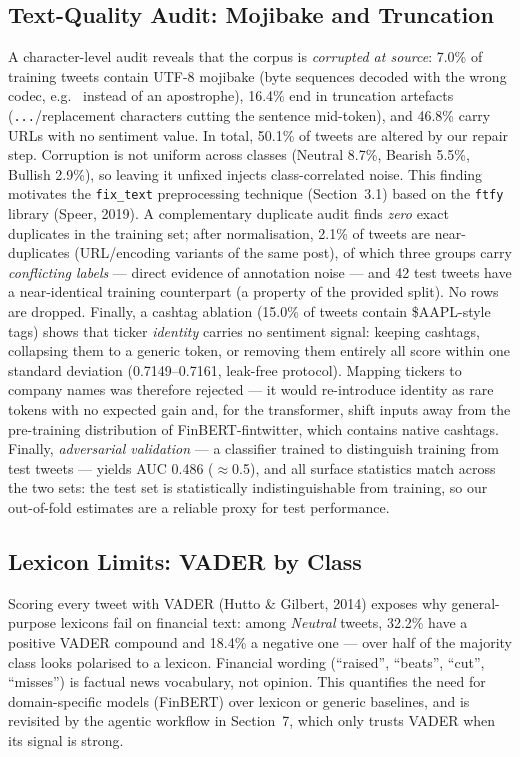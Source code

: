 \documentclass[11pt,a4paper]{article}
\begin{document}
\subsection{Text-Quality Audit: Mojibake and Truncation}
A character-level audit reveals that the corpus is \emph{corrupted at source}: 7.0\% of training
tweets contain UTF-8 mojibake (byte sequences decoded with the wrong codec, e.g.\
\texttt{} instead of an apostrophe), 16.4\% end in truncation artefacts
(\texttt{...}/replacement characters cutting the sentence mid-token), and 46.8\% carry URLs with no
sentiment value. In total, 50.1\% of tweets are altered by our repair step. Corruption is not
uniform across classes (Neutral 8.7\%, Bearish 5.5\%, Bullish 2.9\%), so leaving it unfixed injects
class-correlated noise. This finding motivates the \texttt{fix\_text} preprocessing technique
(Section~3.1) based on the \texttt{ftfy} library (Speer, 2019). A complementary duplicate audit
finds \emph{zero} exact duplicates in the training set; after normalisation, 2.1\% of tweets are
near-duplicates (URL/encoding variants of the same post), of which three groups carry
\emph{conflicting labels} --- direct evidence of annotation noise --- and 42 test tweets have a
near-identical training counterpart (a property of the provided split). No rows are dropped.
Finally, a cashtag ablation (15.0\% of tweets contain \$AAPL-style tags) shows that ticker
\emph{identity} carries no sentiment signal: keeping cashtags, collapsing them to a generic token,
or removing them entirely all score within one standard deviation (0.7149--0.7161, leak-free
protocol). Mapping tickers to company names was therefore rejected --- it would re-introduce
identity as rare tokens with no expected gain and, for the transformer, shift inputs away from the
pre-training distribution of FinBERT-fintwitter, which contains native cashtags. Finally, \emph{adversarial validation} --- a classifier trained to distinguish training
from test tweets --- yields AUC 0.486 ($\approx$0.5), and all surface statistics match across the
two sets: the test set is statistically indistinguishable from training, so our out-of-fold
estimates are a reliable proxy for test performance.

\subsection{Lexicon Limits: VADER by Class}
Scoring every tweet with VADER (Hutto \& Gilbert, 2014) exposes why general-purpose lexicons fail
on financial text: among \emph{Neutral} tweets, 32.2\% have a positive VADER compound and 18.4\% a
negative one --- over half of the majority class looks polarised to a lexicon. Financial wording
(``raised'', ``beats'', ``cut'', ``misses'') is factual news vocabulary, not opinion. This
quantifies the need for domain-specific models (FinBERT) over lexicon or generic baselines, and is
revisited by the agentic workflow in Section~7, which only trusts VADER when its signal is strong.
\end{document}
